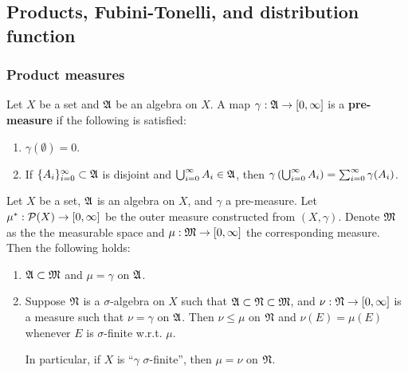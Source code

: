 \documentclass[a4paper]{article}
\begin{document}
\subsection{Products, Fubini-Tonelli, and distribution 
function}

\subsubsection{Product measures}

\begin{defi}
Let $X$ be a set and $\mathfrak{A}$ be an algebra on $X$. A map
$\gamma: \mathfrak{A} \to [0, \infty]$ is a \textbf{pre-measure}
if the following is satisfied:
\begin{enumerate}
  \item $\gamma(\emptyset) = 0$.
  \item If $\{ A_i \}_{i=0}^\infty \subset \mathfrak{A}$ is disjoint and
  $\bigcup_{i=0}^\infty A_i \in \mathfrak{A}$, then $\gamma \left( \bigcup_{i=0}^\infty A_i \right)
  = \sum_{i=0}^\infty \gamma(A_i)$.
\end{enumerate}

\end{defi}

\begin{thm}
Let $X$ be a set, $\mathfrak{A}$ is an algebra on $X$, and
$\gamma$ a pre-measure. Let $\mu^* : \mathcal{P} (X) \to [0, \infty]$
be the outer measure constructed from $(X, \gamma)$.
Denote $\mathfrak{M}$ as the the measurable space and
$\mu: \mathfrak{M} \to [0, \infty]$ the corresponding measure.
Then the following holds:
\begin{enumerate}
  \item $\mathfrak{A} \subset \mathfrak{M}$ and $\mu = \gamma$ on $\mathfrak{A}$.

  \item Suppose $\mathfrak{N}$ is a $\sigma$-algebra on $X$
  such that $\mathfrak{A} \subset \mathfrak{N} \subset \mathfrak{M}$, and
  $\nu: \mathfrak{N} \to [0, \infty]$ is a measure such that
  $\nu = \gamma$ on $\mathfrak{A}$. Then $\nu \leq \mu$ on $\mathfrak{N}$
  and $\nu(E) = \mu(E)$ whenever $E$ is $\sigma$-finite
  w.r.t. $\mu$.

  In particular, if $X$ is ``$\gamma$ $\sigma$-finite'',
  then $\mu = \nu$ on $\mathfrak{N}$.
\end{enumerate}
\end{thm}
\end{document}

